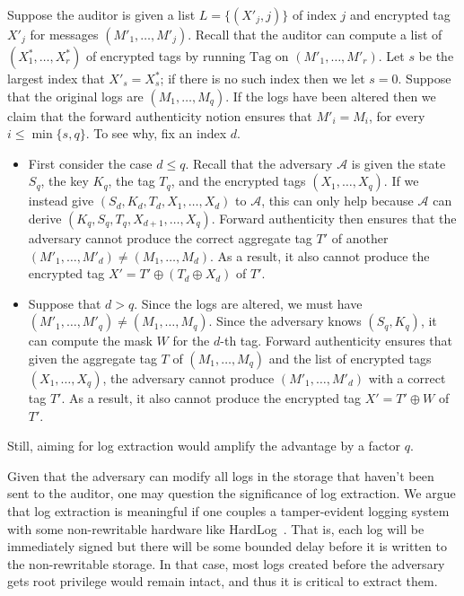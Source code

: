 \documentclass[sigconf]{sty/acmart}
\newcommand{\heading}[1]{\vspace{6pt}\noindent{\underline{\textsc{#1}}}}
\newcommand{\advA}{{\mathcal A}}
\newcommand{\Agg}{\mathrm{Tag}}
\newcommand{\xor}{\oplus}
\begin{document}
Suppose the auditor is given a list $L = \{(X'_j, j)\}$ of index $j$ and encrypted tag $X'_j$ for messages
$(M'_1, \ldots, M'_j)$. 
Recall that the auditor can compute a list of $(X^*_1, \ldots, X^*_r)$ of encrypted tags 
by running $\Agg$ on $(M'_1, \ldots, M'_r)$. 
Let $s$ be the largest index that $X'_s = X^*_s$; if there is no such index then we let $s = 0$. 
Suppose that the original logs are $(M_1, \ldots, M_q)$.
If the logs have been altered then we claim that the forward authenticity notion ensures that $M'_i = M_i$, for every $i \leq \min\{s, q\}$. 
To see why, fix an index $d$. 
\begin{itemize}[noitemsep, nosep, label=$\bullet$, leftmargin=*]
\item First consider the case $d \leq q$. 
Recall that the adversary $\advA$ is given the state $S_q$, the key $K_q$, the tag $T_q$, and the encrypted tags $(X_1, \ldots, X_q)$. 
If we instead give $(S_d, K_d, T_d, X_1, \ldots, X_d)$ to $\advA$, 
this can only help because $\advA$ can derive  $(K_q, S_q, T_q, \allowbreak X_{d + 1}, \ldots, X_q)$. 
Forward authenticity then ensures that the adversary cannot produce the correct aggregate tag $T'$ of another 
$(M'_1, \ldots, M'_d) \ne (M_1, \ldots, M_d)$. 
As a result, it also cannot produce the encrypted tag $X' = T' \xor (T_d \xor X_d)$ of $T'$. 
\item Suppose that $d > q$. 
Since the logs are altered, we must have $(M'_1, \ldots, M'_q) \ne (M_1, \ldots, M_q)$. 
Since the adversary knows $(S_q, K_q)$, it can compute the mask $W$ for the $d$-th tag. 
Forward authenticity ensures that given the aggregate tag $T$ of $(M_1, \ldots, M_q)$
and the list of encrypted tags $(X_1, \ldots, X_q)$, 
the adversary cannot produce $(M'_1, \ldots, M'_d)$ with a correct tag $T'$. 
As a result, it also cannot produce the encrypted tag $X' = T' \xor W$ of $T'$. 
\end{itemize}
Still, aiming for log extraction would amplify the advantage by a factor $q$. 


\heading{Discussion.} Given that the adversary can modify all logs in the storage that haven't been sent to the auditor, one may question the significance of log extraction.
We argue that log extraction is meaningful if one couples
a tamper-evident logging system with some non-rewritable hardware like HardLog~\cite{hardlog}. 
That is, each log will be immediately signed but there will be some  bounded delay before it is written to the non-rewritable storage. 
In that case,  most logs created before the adversary gets root privilege would remain intact, and thus it is critical to extract them. 
\end{document}
